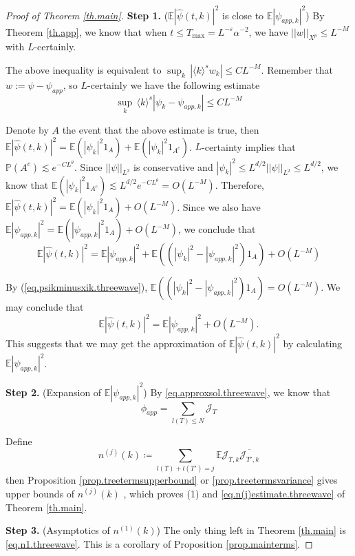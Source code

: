 \begin{proof}[Proof of Theorem \ref{th.main}] \textbf{Step 1.} ($\mathbb E |\widehat \psi(t, k)|^2$ is close to $\mathbb E |\psi_{app,k}|^2$) By Theorem \ref{th.app}, we know that when $t\le T_{\text{max}}= L^{-\varepsilon}\alpha^{-2}$, we have $||w||_{X^p}\le L^{-M}$ with $L$-certainly. 


The above inequality is equivalent to $\sup_k\, |\langle k \rangle^s w_k|\le CL^{-M}$. Remember that $w:=\psi-\psi_{app}$, so $L$-certainly we have the following estimate
\begin{equation}\label{eq.psikminusxik.threewave}
    \sup_k\, \langle k \rangle^s |\psi_k-\psi_{app,k}|\le CL^{-M}
\end{equation}

Denote by $A$ the event that the above estimate is true, then $\mathbb E |\widehat \psi(t, k)|^2=\mathbb E (|\psi_k|^2 1_{A})+\mathbb E (|\psi_k|^2 1_{A^c})$. $L$-certainty implies that $\mathbb P(A^c) \lesssim e^{-CL^{\theta}}$. Since $||\psi||_{L^2}$ is conservative and $|\psi_k|^2\le L^{d/2} ||\psi||_{L^2}\le L^{d/2}$, we know that $\mathbb E (|\psi_k|^2 1_{A^c})\lesssim L^{d/2} e^{-CL^{\theta}}= O(L^{-M})$. Therefore, $\mathbb E |\widehat \psi(t, k)|^2=\mathbb E (|\psi_k|^2 1_{A})+O(L^{-M})$. Since we also have $\mathbb E |\psi_{app,k}|^2=\mathbb E (|\psi_{app,k}|^2 1_{A})+O(L^{-M})$, we conclude that
\begin{equation}
    \mathbb E |\widehat \psi(t, k)|^2=\mathbb E |\psi_{app,k}|^2+\mathbb E ((|\psi_k|^2-|\psi_{app,k}|^2)1_{A})+O(L^{-M})
\end{equation}

By (\ref{eq.psikminusxik.threewave}), $\mathbb E ((|\psi_k|^2-|\psi_{app,k}|^2)1_{A})=O(L^{-M})$. We may conclude that 
\begin{equation}
    \mathbb E |\widehat \psi(t, k)|^2=\mathbb E |\psi_{app,k}|^2+O(L^{-M}).
\end{equation}
This suggests that we may get the approximation of $\mathbb E |\widehat \psi(t, k)|^2$ by calculating $\mathbb E |\psi_{app,k}|^2$.

\textbf{Step 2.} (Expansion of $\mathbb E |\psi_{app,k}|^2$)
By \eqref{eq.approxsol.threewave}, we know that 
\begin{equation}
    \phi_{app}=\sum_{l(T)\le N} \mathcal{J}_T
\end{equation}

Define 
\begin{equation}\label{eq.n(j).threewave}
    n^{(j)}(k)\coloneq \sum_{l(T)+l(T')=j} \mathbb E \mathcal{J}_{T,k}\overline{\mathcal{J}_{T',k}}
\end{equation}
then Proposition \ref{prop.treetermsupperbound} or \ref{prop.treetermsvariance} gives upper bounds of $n^{(j)}(k)$ , which proves (1) and \eqref{eq.n(j)estimate.threewave} of Theorem \ref{th.main}.


\textbf{Step 3.} (Asymptotics of $n^{(1)}(k)$) The only thing left in Theorem \ref{th.main} is \eqref{eq.n1.threewave}. This is a corollary of Proposition \ref{prop.mainterms}.
\end{proof}
